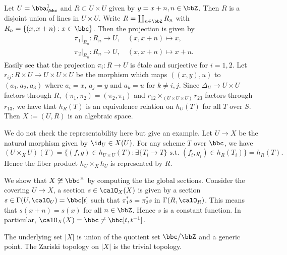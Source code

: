     \begin{example}\label{eg:C/Z_as_algebraic_space}
        Let \(U = \bba_\bbc^1\) and \(R \subset U \times U\) given by \(y=x+n, n \in \bbZ\).
        Then \(R\) is a disjoint union of lines in \(U \times U\).
        Write \(R = \coprod_{n\in \bbZ} R_n\) with \(R_n = \{(x,x+n): x \in \bbc\}\).
        Then the projection is given by 
        \begin{align*}
            &\pi_1|_{R_n}:R_n \to U, \quad (x,x+n) \mapsto x, \\
            &\pi_2|_{R_n}:R_n \to U, \quad (x,x+n) \mapsto x+n.
        \end{align*} 
        Easily see that the projection \(\pi_i: R \to U\) is \'etale and surjective for \(i=1,2\).
        Let \(r_{ij}:R \times U \to U \times U \times U\) be the morphism which maps \(((x,y),u)\) to \((a_1,a_2,a_3)\) where \(a_i = x\), \(a_j = y\) and \(a_k = u\) for \(k \neq i,j\).
        Since \(\Delta_U \to U\times U\) factors through \(R\), \((\pi_1,\pi_2) = (\pi_2,\pi_1)\) and 
        \(r_{12} \times_{(U\times U\times U)} r_{23}\) factors through \(r_{13}\), 
        we have that \(h_R(T)\) is an equivalence relation on \(h_U(T)\) for all \(T\) over \(S\).
        Then \(X := (U,R)\) is an algebraic space.
        
        We do not check the representability here but give an example.
        Let \(U \to X\) be the natural morphism given by \(\id_U \in X(U)\).
        For any scheme \(T\) over \(\bbc\), we have
        \[ (U\times_X U)(T) = \{(f,g) \in h_{U\times U}(T): \exists \{T_i \to T\} \text{ s.t. } (f_i,g_i) \in h_R(T_i) \} = h_R(T). \]
        Hence the fiber product \(h_U \times_X h_U\) is represented by \(R\).
        
        We show that \(X \not\cong \bbc^{\times}\) by computing the the global sections.
        Consider the covering \(U \to X\), a section \(s \in \calO_X(X)\) is given by a section \(s \in \Gamma(U,\calO_U) = \bbc[t]\) such that \(\pi_1^*s = \pi_2^*s\) in \(\Gamma(R,\calO_R)\).
        This means that \(s(x+n) = s(x)\) for all \(n \in \bbZ\).
        Hence \(s\) is a constant function.
        In particular, \(\calO_X(X) = \bbc \neq \bbc[t,t^{-1}]\).

        The underlying set \(|X|\) is union of the quotient set \(\bbc/\bbZ\) and a generic point.
        The Zariski topology on \(|X|\) is the trivial topology.
    \end{example}

